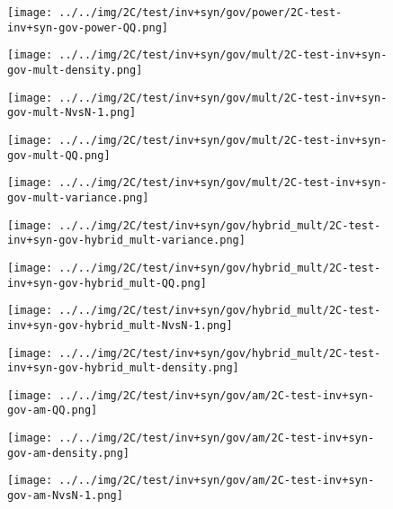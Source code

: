 \begin{figure}[H]
\centering	\texttt{[image: ../../img/2C/test/inv+syn/gov/power/2C-test-inv+syn-gov-power-QQ.png]}
\end{figure}
\begin{figure}[H]
\centering	\texttt{[image: ../../img/2C/test/inv+syn/gov/mult/2C-test-inv+syn-gov-mult-density.png]}
\end{figure}
\begin{figure}[H]
\centering	\texttt{[image: ../../img/2C/test/inv+syn/gov/mult/2C-test-inv+syn-gov-mult-NvsN-1.png]}
\end{figure}
\begin{figure}[H]
\centering	\texttt{[image: ../../img/2C/test/inv+syn/gov/mult/2C-test-inv+syn-gov-mult-QQ.png]}
\end{figure}
\begin{figure}[H]
\centering	\texttt{[image: ../../img/2C/test/inv+syn/gov/mult/2C-test-inv+syn-gov-mult-variance.png]}
\end{figure}
\begin{figure}[H]
\centering	\texttt{[image: ../../img/2C/test/inv+syn/gov/hybrid\_mult/2C-test-inv+syn-gov-hybrid\_mult-variance.png]}
\end{figure}
\begin{figure}[H]
\centering	\texttt{[image: ../../img/2C/test/inv+syn/gov/hybrid\_mult/2C-test-inv+syn-gov-hybrid\_mult-QQ.png]}
\end{figure}
\begin{figure}[H]
\centering	\texttt{[image: ../../img/2C/test/inv+syn/gov/hybrid\_mult/2C-test-inv+syn-gov-hybrid\_mult-NvsN-1.png]}
\end{figure}
\begin{figure}[H]
\centering	\texttt{[image: ../../img/2C/test/inv+syn/gov/hybrid\_mult/2C-test-inv+syn-gov-hybrid\_mult-density.png]}
\end{figure}
\begin{figure}[H]
\centering	\texttt{[image: ../../img/2C/test/inv+syn/gov/am/2C-test-inv+syn-gov-am-QQ.png]}
\end{figure}
\begin{figure}[H]
\centering	\texttt{[image: ../../img/2C/test/inv+syn/gov/am/2C-test-inv+syn-gov-am-density.png]}
\end{figure}
\begin{figure}[H]
\centering	\texttt{[image: ../../img/2C/test/inv+syn/gov/am/2C-test-inv+syn-gov-am-NvsN-1.png]}
\end{figure}
